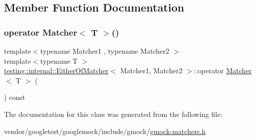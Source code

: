 \subsection{Member Function Documentation}
\mbox{\label{classtesting_1_1internal_1_1_either_of_matcher_aef76a8b45451ec7abf845a2b9dd74bfb}} 
\subsubsection{\texorpdfstring{operator Matcher$<$ T $>$()}{operator Matcher< T >()}}
{\footnotesize\ttfamily template$<$typename Matcher1 , typename Matcher2 $>$ \\
template$<$typename T $>$ \\
\hyperlink{classtesting_1_1internal_1_1_either_of_matcher}{testing\+::internal\+::\+Either\+Of\+Matcher}$<$ Matcher1, Matcher2 $>$\+::operator \hyperlink{classtesting_1_1_matcher}{Matcher}$<$ T $>$ (\begin{DoxyParamCaption}{ }\end{DoxyParamCaption}) const\hspace{0.3cm}{\ttfamily [inline]}}



The documentation for this class was generated from the following file\+:\begin{DoxyCompactItemize}
\item 
vendor/googletest/googlemock/include/gmock/\hyperlink{gmock-matchers_8h}{gmock-\/matchers.\+h}\end{DoxyCompactItemize}
